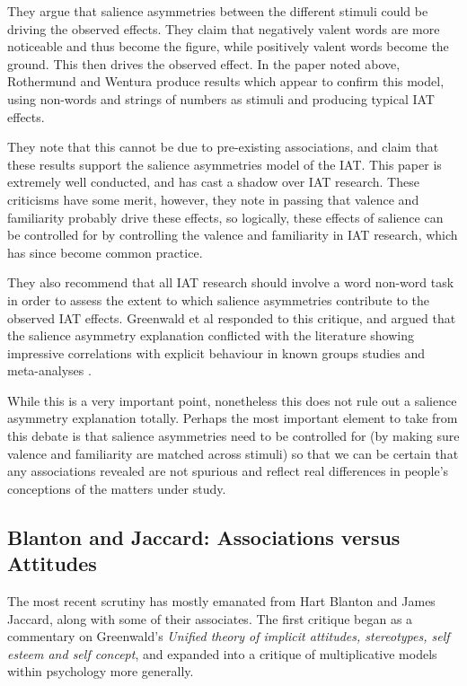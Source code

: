 They argue that salience asymmetries between the different stimuli could be driving the observed effects. They claim that negatively valent words are more noticeable and thus become the figure, while positively valent words become the ground. This then drives the observed  effect. In the paper noted above, Rothermund and Wentura produce results which appear to confirm this model, using non-words and strings of numbers as stimuli and producing typical IAT effects. 

They note that this cannot be due to pre-existing associations, and claim that these results support the salience asymmetries model of the IAT. This paper is extremely well conducted, and has  cast a shadow over  IAT research. These criticisms have some merit, however, they note in passing that valence and familiarity probably drive these effects, so logically, these effects of salience can be controlled for by controlling the valence and familiarity in IAT research, which has since become common practice. 

They also recommend that all IAT research should involve a word non-word task in order to assess the extent to which salience asymmetries contribute to the observed IAT effects. Greenwald  et al \cite{Greenwald2005} responded to this critique, and argued that the salience asymmetry explanation conflicted with the literature showing impressive correlations with explicit behaviour in known groups studies and meta-analyses \cite{Greenwald2009}. 

While this is a very important point, nonetheless this does not rule out a salience asymmetry explanation totally. Perhaps the most important element to take from this debate is that salience asymmetries need to be controlled for (by making sure valence and familiarity are matched across stimuli) so that we can be certain that any associations revealed are not spurious and reflect real differences in people's conceptions of the matters under study. 

\subsection{Blanton and Jaccard: Associations versus Attitudes}
\label{sec:blant-jacc-assoc}

The most recent scrutiny has mostly emanated from Hart Blanton and James Jaccard, along with some of their associates. The first critique began as a commentary on Greenwald's \cite{greenwald2002}  \textit{Unified theory of implicit attitudes, stereotypes, self esteem and self concept}, and expanded into a critique of multiplicative models within psychology more generally. 

